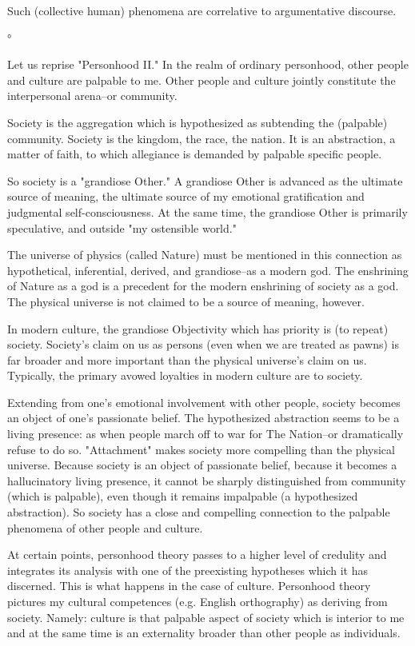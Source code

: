 \begin{enumerate}[label=\alph*.]
Such (collective human) phenomena are correlative to argumentative discourse.

°

Let us reprise "Personhood II." In the realm of ordinary personhood, other people and culture are palpable to me. Other people and culture jointly constitute the interpersonal arena–or community.

Society is the aggregation which is hypothesized as subtending the (palpable) community. Society is the kingdom, the race, the nation. It is an abstraction, a matter of faith, to which allegiance is demanded by palpable specific people.

So society is a "grandiose Other." A grandiose Other is advanced as the ultimate source of meaning, the ultimate source of my emotional gratification and judgmental self-consciousness. At the same time, the grandiose Other is primarily speculative, and outside "my ostensible world."

The universe of physics (called Nature) must be mentioned in this connection as hypothetical, inferential, derived, and grandiose–as a modern god. The enshrining of Nature as a god is a precedent for the modern enshrining of society as a god. The physical universe is not claimed to be a source of meaning, however.

In modern culture, the grandiose Objectivity which has priority is (to repeat) society. Society's claim on us as persons (even when we are treated as pawns) is far broader and more important than the physical universe's claim on us. Typically, the primary avowed loyalties in modern culture are to society.

Extending from one's emotional involvement with other people, society becomes an object of one's passionate belief. The hypothesized abstraction seems to be a living presence: as when people march off to war for The Nation–or dramatically refuse to do so. "Attachment" makes society more compelling than the physical universe. Because society is an object of passionate belief, because it becomes a hallucinatory living presence, it cannot be sharply distinguished from community (which is palpable), even though it remains impalpable (a hypothesized abstraction). So society has a close and compelling connection to the palpable phenomena of other people and culture.

At certain points, personhood theory passes to a higher level of credulity and integrates its analysis with one of the preexisting hypotheses which it has discerned. This is what happens in the case of culture. Personhood theory pictures my cultural competences (e.g. English orthography) as deriving from society. Namely: culture is that palpable aspect of society which is interior to me and at the same time is an externality broader than other people as individuals.


\end{enumerate}
